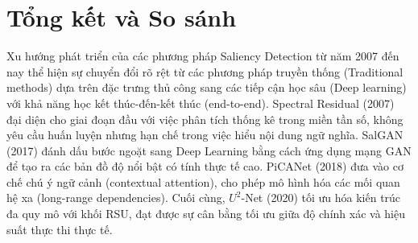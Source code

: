 \section{Tổng kết và So sánh}

Xu hướng phát triển của các phương pháp Saliency Detection từ năm 2007 đến nay thể hiện sự chuyển đổi rõ rệt từ các phương pháp truyền thống (Traditional methods) dựa trên đặc trưng thủ công sang các tiếp cận học sâu (Deep learning) với khả năng học kết thúc-đến-kết thúc (end-to-end). Spectral Residual (2007) đại diện cho giai đoạn đầu với việc phân tích thống kê trong miền tần số, không yêu cầu huấn luyện nhưng hạn chế trong việc hiểu nội dung ngữ nghĩa. SalGAN (2017) đánh dấu bước ngoặt sang Deep Learning bằng cách ứng dụng mạng GAN để tạo ra các bản đồ độ nổi bật có tính thực tế cao. PiCANet (2018) đưa vào cơ chế chú ý ngữ cảnh (contextual attention), cho phép mô hình hóa các mối quan hệ xa (long-range dependencies). Cuối cùng, $U^2$-Net (2020) tối ưu hóa kiến trúc đa quy mô với khối RSU, đạt được sự cân bằng tối ưu giữa độ chính xác và hiệu suất thực thi thực tế.

